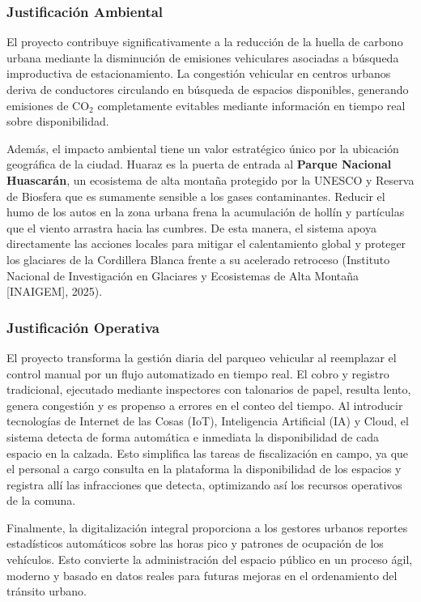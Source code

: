 \documentclass[12pt,a4paper]{article}
\begin{document}
\subsubsection{Justificación Ambiental}

El proyecto contribuye significativamente a la reducción de la huella de carbono urbana mediante la disminución de emisiones vehiculares asociadas a búsqueda improductiva de estacionamiento. La congestión vehicular en centros urbanos deriva de conductores circulando en búsqueda de espacios disponibles, generando emisiones de CO$_2$ completamente evitables mediante información en tiempo real sobre disponibilidad.

Además, el impacto ambiental tiene un valor estratégico único por la ubicación geográfica de la ciudad. Huaraz es la puerta de entrada al \textbf{Parque Nacional Huascarán}, un ecosistema de alta montaña protegido por la UNESCO y Reserva de Biosfera que es sumamente sensible a los gases contaminantes. Reducir el humo de los autos en la zona urbana frena la acumulación de hollín y partículas que el viento arrastra hacia las cumbres. De esta manera, el sistema apoya directamente las acciones locales para mitigar el calentamiento global y proteger los glaciares de la Cordillera Blanca frente a su acelerado retroceso (Instituto Nacional de Investigación en Glaciares y Ecosistemas de Alta Montaña [INAIGEM], 2025).

\subsubsection{Justificación Operativa}

El proyecto transforma la gestión diaria del parqueo vehicular al reemplazar el control manual por un flujo automatizado en tiempo real. El cobro y registro tradicional, ejecutado mediante inspectores con talonarios de papel, resulta lento, genera congestión y es propenso a errores en el conteo del tiempo. Al introducir tecnologías de Internet de las Cosas (IoT), Inteligencia Artificial (IA) y Cloud, el sistema detecta de forma automática e inmediata la disponibilidad de cada espacio en la calzada. Esto simplifica las tareas de fiscalización en campo, ya que el personal a cargo consulta en la plataforma la disponibilidad de los espacios y registra allí las infracciones que detecta, optimizando así los recursos operativos de la comuna.

Finalmente, la digitalización integral proporciona a los gestores urbanos reportes estadísticos automáticos sobre las horas pico y patrones de ocupación de los vehículos. Esto convierte la administración del espacio público en un proceso ágil, moderno y basado en datos reales para futuras mejoras en el ordenamiento del tránsito urbano.
\end{document}
